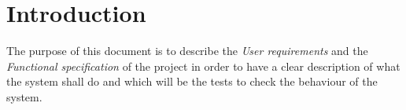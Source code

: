 \section{Introduction}
The purpose of this document is to describe the \textit{User requirements} and the \textit{Functional specification} of the project in order to have a clear 
description of what the system shall do and which will be the tests to check the behaviour of the system.